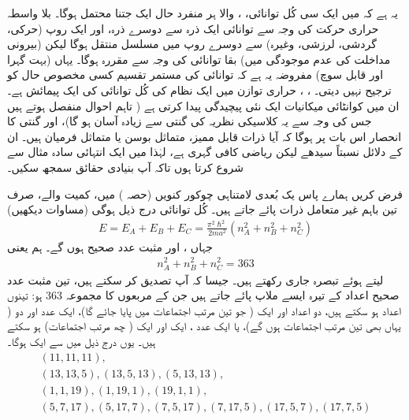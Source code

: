  یہ ہے کہ  میں ایک سی کُل توانائی، ، والا ہر منفرد حال ایک جتنا محتمل ہوگا۔ بلا واسطہ حراری حرکت کی وجہ سے توانائی ایک ذرہ سے دوسرے ذرہ، اور ایک روپ (حرکی، گردشی، لرزشی، وغیرہ) سے دوسرے روپ میں مسلسل منتقل ہوگا لیکن (بیرونی مداخلت کی عدم موجودگی میں) بقا توانائی کی وجہ سے  مقررہ ہوگا۔ یہاں (بہت گہرا اور قابل سوچ) مفروضہ یہ ہے کہ توانائی کی مستمر تقسیم کسی مخصوص حال کو ترجیح نہیں دیتی۔ ، ، حراری توازن میں ایک نظام کی کُل توانائی کی ایک پیمائش ہے۔ ان  میں کوانٹائی میکانیات ایک نئی پیچیدگی پیدا کرتی ہے ( تاہم احوال منفصل ہوتے ہیں جس کی وجہ سے یہ کلاسیکی نظریہ کی گنتی سے زیادہ آسان ہو گا)، اور گنتی کا انحصار اس بات پر ہوگا کہ آیا ذرات قابل ممیز، متماثل بوسن یا متماثل فرمیان ہیں۔ ان کے دلائل نسبتاً سیدھے لیکن ریاضی کافی گہری ہے، لہٰذا میں ایک انتہائی سادہ مثال سے شروع کرتا ہوں تاکہ آپ بنیادی حقائق سمجھ سکیں۔

 
فرض کریں ہمارے پاس یک بُعدی لامتناہی چوکور کنویں (حصہ ) میں، کمیت  والے، صرف تین باہم غیر متعامل ذرات پائے جاتے ہیں۔ کُل توانائی درج ذیل ہوگی (مساوات  دیکھیں)
\begin{align}
	E = E_A + E_B + E_C = \frac{\pi^2 \hslash ^2}{2ma^2}(n^2_A + n^2_B + n^2_C)
\end{align}
جہاں ،  اور  مثبت عدد صحیح ہوں گے۔ ہم  یعنی
\begin{align}
	n^2_A + n^2_B + n^2_C = 363
\end{align} 
لیتے ہوئے تبصرہ جاری رکھتے ہیں۔ جیسا کہ آپ تصدیق کر سکتے ہیں، تین مثبت عدد صحیح اعداد کے تیرہ ایسے ملاپ پائے جاتے ہیں جن کے مربعوں کا مجموعہ \num{363} ہو: تینوں اعداد  ہو سکتے ہیں، دو اعداد  اور ایک  ( جو تین مرتب اجتماعات میں پایا جائے گا)، ایک عدد اور دو  ( یہاں بھی تین مرتب اجتماعات ہوں گے)، یا ایک عدد ، ایک  اور ایک  ( چھ مرتب اجتماعات) ہو سکتے ہیں۔ یوں  درج ذیل میں سے ایک ہوگا۔
\begin{gather*}
	(11, 11, 11),\\
	(13, 13, 5), (13, 5, 13), (5, 13, 13),\\
	(1, 1, 19), (1, 19, 1), (19, 1, 1),\\
	(5, 7, 17), (5, 17, 7), (7, 5, 17), (7, 17, 5), (17, 5, 7), (17, 7, 5)
\end{gather*}

